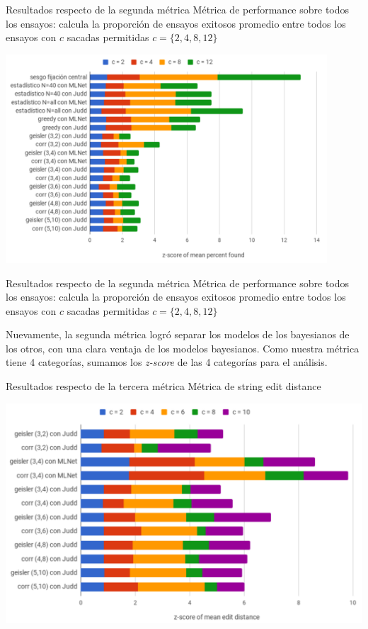 \documentclass[compress]{beamer}
\begin{document}
\begin{frame}{Resultados respecto de la segunda métrica}
{Métrica de performance sobre todos los ensayos: calcula la proporción de ensayos exitosos promedio entre todos los ensayos con $c$ sacadas permitidas $c = \{2,4,8,12\}$}

\begin{center}
\includegraphics[width=0.9\textwidth]{images/z-score-percent-found.png}
\end{center}

\end{frame}

\begin{frame}{Resultados respecto de la segunda métrica}
{Métrica de performance sobre todos los ensayos: calcula la proporción de ensayos exitosos promedio entre todos los ensayos con $c$ sacadas permitidas $c = \{2,4,8,12\}$}

Nuevamente, la segunda métrica logró separar los modelos de los bayesianos de los otros, con una clara ventaja de los modelos bayesianos. Como nuestra métrica tiene 4 categorías, sumamos los \textit{z-score} de las 4 categorías para el análisis.
\end{frame}

\begin{frame}{Resultados respecto de la tercera métrica}
{Métrica de string edit distance}

\begin{center}
\includegraphics[width=\textwidth]{images/z-score-mean-edit-distance.png}
\end{center}

\end{frame}
\end{document}
